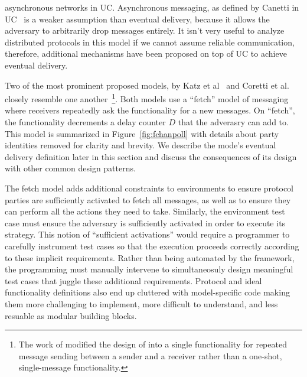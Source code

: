 asynchronous networks in UC.  Asynchronous messaging, as defined by Canetti in
UC~\cite{uc} is a weaker assumption than eventual delivery, because it allows
the adversary to arbitrarily drop messages entirely.  It isn't very useful to
analyze distributed protocols in this model if we cannot assume reliable
communication, therefore, additional mechanisms have been proposed on top of UC
to achieve eventual delivery.

Two of the most prominent proposed models, by Katz et
al~\cite{katz2013universally} and Coretti et al.~\cite{coretti2016constant}
closely resemble one another~\footnote{The work of \cite{coretti2016constant}
modified the design of \cite{katz2013universally} into a single functionality
for repeated message sending between a sender and a receiver rather than a
one-shot, single-message functionality.}.  Both models use a ``fetch'' model of
messaging where receivers repeatedly ask the functionality for a new messages.
On ``fetch'', the functionality decrements a delay counter $D$ that the
adverasry can add to.  This model is summarized in Figure~\ref{fig:fchanpoll}
with details about party identities removed for clarity and brevity.  We
describe the mode's eventual delivery definition later in this section and
discuss the consequences of its design with other common design patterns.

The fetch model adds additional constraints to environments to ensure protocol
parties are sufficiently activated to fetch all messages, as well as to ensure
they can perform all the actions they need to take.  Similarly, the environment
test case must ensure the adversary is sufficiently activated in order to
execute its strategy.  This notion of ``sufficient activations'' would require
a programmer to carefully instrument test cases so that the execution proceeds
correctly according to these implicit requirements.  Rather than being
automated by the framework, the programming must manually intervene to
simultaneosuly design meaningful test cases that juggle these additional
requirements.  Protocol and ideal functionality definitions also end up
cluttered with model-specific code making them more challenging to implement,
more difficult to understand, and less resuable as modular building blocks.

